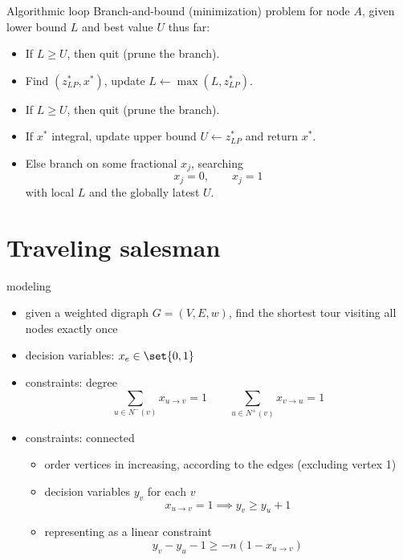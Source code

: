 \documentclass[aspectratio=169, handout]{beamer}
\begin{document}
\begin{frame}{Algorithmic loop}
    Branch-and-bound (minimization) problem for node $A$, given lower bound $L$ and best value $U$ thus far:

    \begin{itemize}
        \item If $L \ge U$, then quit (prune the branch).
        \item Find $(z^*_{LP}, x^*)$, update $L \gets \max(L, z^*_{LP})$.
        \item If $L \ge U$, then quit (prune the branch).
        \item If $x^*$ integral, update upper bound $U \gets z^*_{LP}$ and return $x^*$.
        \item Else branch on some fractional $x_j$, searching
              $$
                  x_j = 0,
                  \qquad
                  x_j = 1
              $$
              with local $L$ and the globally latest $U$.
    \end{itemize}
\end{frame}

\section{Traveling salesman}
\frame{\tableofcontents[currentsection]}

\begin{frame}{modeling}
    \begin{itemize}[<+->]
        \item given a weighted digraph $G = (V, E, w)$, find the shortest tour visiting all nodes exactly once
        \item decision variables: $x_e \in \set{0, 1}$
        \item constraints: degree
              $$
                  \sum_{u \in N^-(v)} x_{u \to v} = 1
                  \qquad
                  \sum_{u \in N^+(v)} x_{v \to u} = 1
              $$
        \item constraints: connected
              \begin{itemize}
                  \item order vertices in increasing, according to the edges (excluding vertex 1)
                  \item decision variables $y_v$ for each $v$
                        $$
                            x_{u \to v} = 1 \implies y_v \ge y_u + 1
                        $$
                  \item representing as a linear constraint \footnotemark
                        $$
                            y_v - y_u - 1 \ge - n (1 - x_{u \to v})
                        $$
              \end{itemize}
    \end{itemize}
\end{frame}
\end{document}
